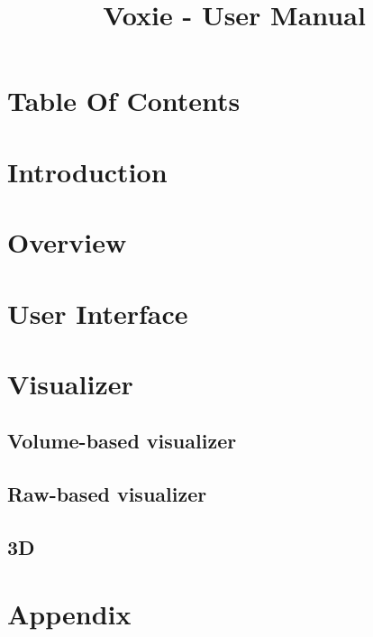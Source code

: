\documentclass[]{article}
\title{Voxie - User Manual}
\author{}
\begin{document}
\maketitle

\section{Table Of Contents}
\tableofcontents
\newpage

\section{Introduction}


\section{Overview}

\section{User Interface}

\section{Visualizer}

\subsection{Volume-based visualizer}

\subsection{Raw-based visualizer}

\subsection{3D}

\section{Appendix}

%
%
\end{document}
